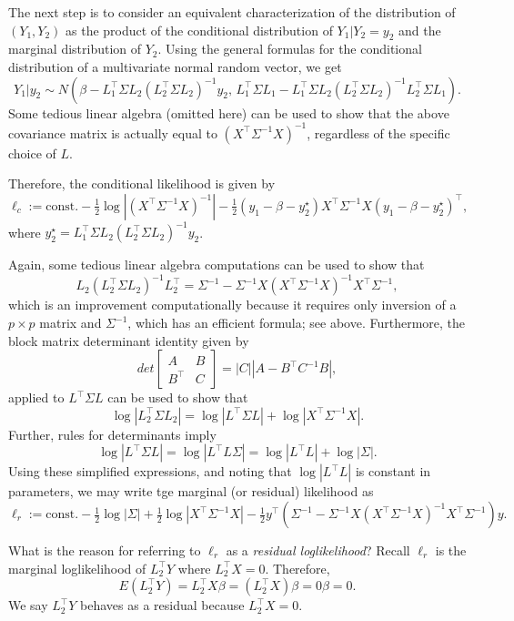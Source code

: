 \documentclass[
]{book}
\begin{document}
The next step is to consider an equivalent characterization of the distribution of \((Y_1, Y_2)\) as the product of the conditional distribution of \(Y_1|Y_2 = y_2\) and the marginal distribution of \(Y_2\). Using the general formulas for the conditional distribution of a multivariate normal random vector, we get
\[Y_1|y_2 \sim N(\beta - L_1^\top \Sigma L_2(L_2^\top \Sigma L_2)^{-1}y_2, \, L_1^\top \Sigma L_1-L_1^\top \Sigma L_2(L_2^\top \Sigma L_2)^{-1} L_2^\top \Sigma L_1).\]
Some tedious linear algebra (omitted here) can be used to show that the above covariance matrix is actually equal to \((X^\top \Sigma^{-1}X)^{-1}\), regardless of the specific choice of \(L\).

Therefore, the conditional likelihood is given by
\[\ell_c := \text{const.} - \tfrac12\log |(X^\top \Sigma^{-1}X)^{-1}| -\tfrac{1}{2}(y_1 - \beta - y_2^\star)X^\top \Sigma^{-1}X(y_1 - \beta - y_2^\star)^\top, \]
where \(y_2^\star = L_1^\top \Sigma L_2(L_2^\top \Sigma L_2)^{-1}y_2\).

Again, some tedious linear algebra computations can be used to show that
\[L_2(L_2^\top \Sigma L_2)^{-1}L_2^\top = \Sigma^{-1} - \Sigma^{-1}X(X^\top\Sigma^{-1} X)^{-1} X^\top\Sigma^{-1},\]
which is an improvement computationally because it requires only inversion of a \(p\times p\) matrix and \(\Sigma^{-1}\), which has an efficient formula; see above. Furthermore, the block matrix determinant identity given by
\[det\begin{bmatrix}A & B\\
B^\top & C\end{bmatrix} = |C||A - B^\top C^{-1}B|,\]
applied to \(L^\top\Sigma L\) can be used to show that
\[\log |L_2^\top \Sigma L_2| = \log|L^\top\Sigma L| + \log |X^\top \Sigma^{-1}X|.\]
Further, rules for determinants imply
\[\log|L^\top\Sigma L| = \log|L^\top L\Sigma| = \log|L^\top L|+\log|\Sigma|.\]
Using these simplified expressions, and noting that \(\log|L^\top L|\) is constant in parameters, we may write tge marginal (or residual) likelihood as
\[\ell_r:= \text{const}.-\tfrac12 \log |\Sigma| +\tfrac12 \log|X^\top \Sigma^{-1} X| -\tfrac12 y^\top(\Sigma^{-1} - \Sigma^{-1}X(X^\top\Sigma^{-1} X)^{-1} X^\top\Sigma^{-1})y.\]

What is the reason for referring to \(\ell_r\) as a \emph{residual loglikelihood}? Recall \(\ell_r\) is the marginal loglikelihood of \(L_2^\top Y\) where \(L_2^\top X = 0\). Therefore,
\[E(L_2^\top Y) = L_2^\top X\beta = (L_2^\top X)\beta = 0\beta = 0.\]
We say \(L_2^\top Y\) behaves as a residual because \(L_2^\top X = 0\).
\end{document}
